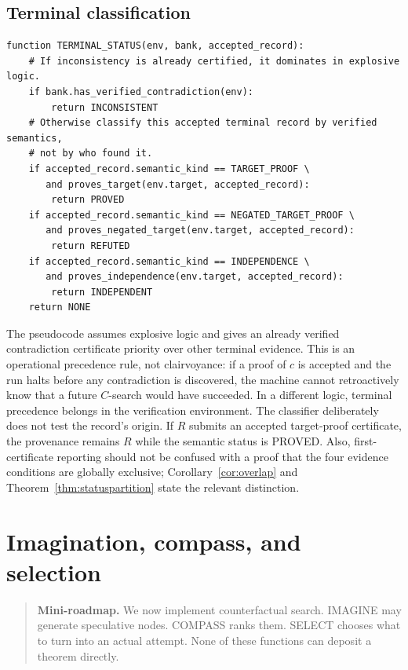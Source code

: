 \documentclass[11pt,openany]{book}
\theoremstyle{definition}
\theoremstyle{remark}
\newenvironment{miniroadmap}{\begin{quote}\small\color{deepblue}\textbf{Mini-roadmap.} }{\end{quote}}
\begin{document}
\section{Terminal classification}
\begin{lstlisting}[style=pseudo,caption={Terminal settlement}]
function TERMINAL_STATUS(env, bank, accepted_record):
    # If inconsistency is already certified, it dominates in explosive logic.
    if bank.has_verified_contradiction(env):
        return INCONSISTENT
    # Otherwise classify this accepted terminal record by verified semantics,
    # not by who found it.
    if accepted_record.semantic_kind == TARGET_PROOF \
       and proves_target(env.target, accepted_record):
        return PROVED
    if accepted_record.semantic_kind == NEGATED_TARGET_PROOF \
       and proves_negated_target(env.target, accepted_record):
        return REFUTED
    if accepted_record.semantic_kind == INDEPENDENCE \
       and proves_independence(env.target, accepted_record):
        return INDEPENDENT
    return NONE
\end{lstlisting}

The pseudocode assumes explosive logic and gives an already verified contradiction certificate priority over other terminal evidence. This is an operational precedence rule, not clairvoyance: if a proof of $c$ is accepted and the run halts before any contradiction is discovered, the machine cannot retroactively know that a future $C$-search would have succeeded. In a different logic, terminal precedence belongs in the verification environment. The classifier deliberately does not test the record's origin. If $R$ submits an accepted target-proof certificate, the provenance remains $R$ while the semantic status is \textsf{PROVED}. Also, first-certificate reporting should not be confused with a proof that the four evidence conditions are globally exclusive; Corollary~\ref{cor:overlap} and Theorem~\ref{thm:statuspartition} state the relevant distinction.

\chapter{Imagination, compass, and selection}
\begin{miniroadmap}
We now implement counterfactual search. IMAGINE may generate speculative nodes. COMPASS ranks them. SELECT chooses what to turn into an actual attempt. None of these functions can deposit a theorem directly.
\end{miniroadmap}
\end{document}
